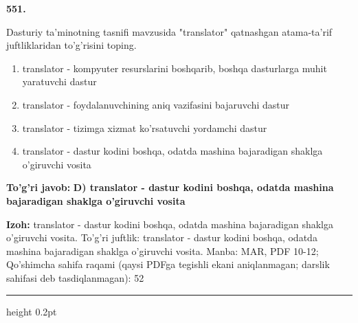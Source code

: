 \documentclass[10pt,a4paper]{article}
\begin{document}
{\bfseries\sffamily\color{ink} 551.}
\par
Dasturiy ta'minotning tasnifi mavzusida "translator" qatnashgan atama-ta'rif juftliklaridan to'g'risini toping.
\begin{enumerate}[label=\Alph*),leftmargin=9mm]
\item translator - kompyuter resurslarini boshqarib, boshqa dasturlarga muhit yaratuvchi dastur
\item translator - foydalanuvchining aniq vazifasini bajaruvchi dastur
\item translator - tizimga xizmat ko'rsatuvchi yordamchi dastur
\item translator - dastur kodini boshqa, odatda mashina bajaradigan shaklga o'giruvchi vosita
\end{enumerate}
\begin{tcolorbox}[enhanced,breakable,colback=teal!4,colframe=teal!60!black,boxrule=0.45pt,arc=1.2mm,left=2.7mm,right=2.7mm,top=1.8mm,bottom=1.8mm,before skip=2mm,after skip=2mm]
{\bfseries\sffamily\color{teal}To'g'ri javob:} \textbf{D) translator - dastur kodini boshqa, odatda mashina bajaradigan shaklga o'giruvchi vosita}
\par\smallskip
{\bfseries Izoh:} translator - dastur kodini boshqa, odatda mashina bajaradigan shaklga o'giruvchi vosita. To'g'ri juftlik: translator - dastur kodini boshqa, odatda mashina bajaradigan shaklga o'giruvchi vosita. Manba: MAR, PDF 10-12; Qo'shimcha sahifa raqami (qaysi PDFga tegishli ekani aniqlanmagan; darslik sahifasi deb tasdiqlanmagan): 52
\end{tcolorbox}
\vspace{2mm}\hrule height 0.2pt\vspace{3mm}
\end{document}
